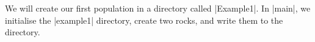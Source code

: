 We will create our first population in a directory called |Example1|.
In |main|, we initialise the |example1| directory, create two rocks,
and write them to the directory.


